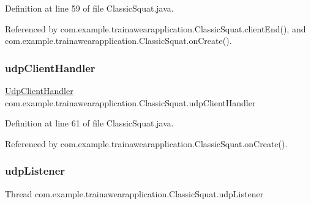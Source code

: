 Definition at line 59 of file Classic\+Squat.\+java.



Referenced by com.\+example.\+trainawearapplication.\+Classic\+Squat.\+client\+End(), and com.\+example.\+trainawearapplication.\+Classic\+Squat.\+on\+Create().

\mbox{\label{classcom_1_1example_1_1trainawearapplication_1_1_classic_squat_a2fd124851e56c8d1a8c7bdbf8fdd8796}} 
\subsubsection{\texorpdfstring{udpClientHandler}{udpClientHandler}}
{\footnotesize\ttfamily \mbox{\hyperlink{classcom_1_1example_1_1trainawearapplication_1_1_udp_client_handler}{Udp\+Client\+Handler}} com.\+example.\+trainawearapplication.\+Classic\+Squat.\+udp\+Client\+Handler\hspace{0.3cm}{\ttfamily [package]}}



Definition at line 61 of file Classic\+Squat.\+java.



Referenced by com.\+example.\+trainawearapplication.\+Classic\+Squat.\+on\+Create().

\mbox{\label{classcom_1_1example_1_1trainawearapplication_1_1_classic_squat_a5c6683281be124ed40b4ad73bcec89fc}} 
\subsubsection{\texorpdfstring{udpListener}{udpListener}}
{\footnotesize\ttfamily Thread com.\+example.\+trainawearapplication.\+Classic\+Squat.\+udp\+Listener\hspace{0.3cm}{\ttfamily [private]}}



